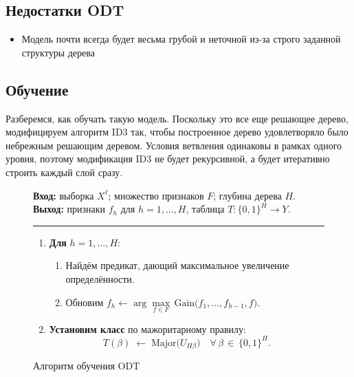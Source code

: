 \subsection{Недостатки ODT}
\begin{itemize}
    \item Модель почти всегда будет весьма грубой и неточной из-за строго заданной структуры дерева
\end{itemize}

\subsection{Обучение}

Разберемся, как обучать такую модель. Поскольку это все еще решающее дерево, модифицируем алгоритм ID3 так, чтобы построенное
дерево удовлетворяло было небрежным решающим деревом. Условия ветвления одинаковы в рамках одного уровня, поэтому модификация
ID3 не будет рекурсивной, а будет итеративно строить каждый слой сразу.

\begin{figure}[ht] %
    \caption{Алгоритм обучения ODT}
    \label{fig:odt}
    
    \textbf{Вход:} выборка $X^{\ell}$; множество признаков $F$; глубина дерева $H$.\\
    \textbf{Выход:} признаки $f_h$ для $h=1,\dots,H$, таблица $T: \{0, 1\}^H \rightarrow Y$.
    
    \hrule\vspace{1em} %
    
    \begin{enumerate}
        \item \textbf{Для} $h = 1,\dots,H$:
              \begin{enumerate}
                  \item Найдём предикат, дающий максимальное увеличение определённости.
                  \item Обновим $f_h \gets \arg\max\limits_{f \in F}\, \mathrm{Gain}\bigl(f_1, \ldots, f_{h-1}, f\bigr)$.
              \end{enumerate}
              
        \item \textbf{Установим класс} по мажоритарному правилу:
              \[
                  T(\beta) \;\gets\; \mathrm{Major}\bigl(U_{H\beta}\bigr)
                  \quad \forall\, \beta \,\in\, \{0, 1\}^H.
              \]
    \end{enumerate}
    
\end{figure}

